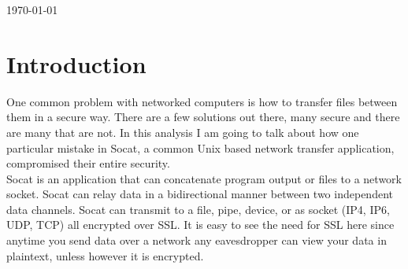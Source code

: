 \documentclass[letterpaper,11pt,notitlepage,fleqn]{article}
\begin{document}
\begin{titlepage}

{\large \today}\\[3cm] %




\vfill %



\end{titlepage}

\tableofcontents
\newpage

\section{Introduction}
\indent One common problem with networked computers is how to transfer files between them in a secure way. There are a few solutions out there, many secure and there are many that are not. In this analysis I am going to talk about how one particular mistake in Socat, a common Unix based network transfer application, compromised their entire security.
\\
\indent Socat is an application that can concatenate program output or files to a network socket. Socat can relay data in a bidirectional manner between two independent data channels. Socat can transmit to a file, pipe, device, or as socket (IP4, IP6, UDP, TCP) all encrypted over SSL. It is easy to see the need for SSL here since anytime you send data over a network any eavesdropper can view your data in plaintext, unless however it is encrypted. 
\\
\\
\end{document}
